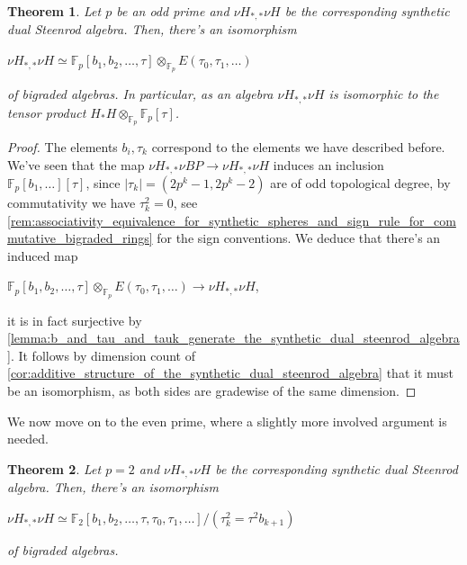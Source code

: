\documentclass[oneside,a4paper]{amsart}
\newcommand{\fieldp}{\mathbb{F}_{p}} %
\newcommand{\fieldtwo}{\mathbb{F}_{2}} %
\theoremstyle{plain}
\newtheorem{thm}{Theorem}[section]
\theoremstyle{definition}
\theoremstyle{remark}
\begin{document}
\begin{thm}
\label{thm:the_structure_of_synthetic_dual_steenrod_algebra_at_odd_primes}
Let $p$ be an odd prime and $\nu H_{*, *} \nu H$ be the corresponding synthetic dual Steenrod algebra. Then, there's an isomorphism 

\begin{center}
$\nu H_{*, *} \nu H \simeq \fieldp[b_{1}, b_{2}, \ldots, \tau] \otimes _{\fieldp} E(\tau_{0}, \tau_{1}, \ldots)$
\end{center}
of bigraded algebras. In particular, as an algebra $\nu H_{*, *} \nu H$ is isomorphic to the tensor product $H_{*}H \otimes _{\fieldp} \fieldp[\tau]$.
\end{thm}

\begin{proof}
The elements $b_{i}, \tau_{k}$ correspond to the elements we have described before. We've seen that the map $\nu H_{*, *} \nu BP \rightarrow \nu H_{*, *} \nu H$ induces an inclusion $\fieldp[b_{1}, \ldots][\tau]$, since $| \tau_{k} | = (2p^{k}-1, 2p^{k}-2)$ are of odd topological degree, by commutativity we have $\tau_{k}^{2} = 0$, see \cref{rem:associativity_equivalence_for_synthetic_spheres_and_sign_rule_for_commutative_bigraded_rings} for the sign conventions. We deduce that there's an induced map 

\begin{center}
$\fieldp[b_{1}, b_{2}, \ldots, \tau] \otimes _{\fieldp} E(\tau_{0}, \tau_{1}, \ldots) \rightarrow \nu H_{*, *} \nu H$,
\end{center}
it is in fact surjective by \cref{lemma:b_and_tau_and_tauk_generate_the_synthetic_dual_steenrod_algebra}. It follows by dimension count of \cref{cor:additive_structure_of_the_synthetic_dual_steenrod_algebra} that it must be an isomorphism, as both sides are gradewise of the same dimension. 
\end{proof}
We now move on to the even prime, where a slightly more involved argument is needed. 

\begin{thm}
\label{thm:the_structure_of_synthetic_dual_steenrod_algebra_at_even_prime}
Let $p = 2$ and $\nu H_{*, *} \nu H$ be the corresponding synthetic dual Steenrod algebra. Then, there's an isomorphism 

\begin{center}
$\nu H_{*, *} \nu H \simeq \fieldtwo[b_{1}, b_{2}, \ldots, \tau, \tau_{0}, \tau_{1}, \ldots] / (\tau_{k}^{2} = \tau^{2} b_{k+1})$
\end{center}
of bigraded algebras. 
\end{thm}
\end{document}
